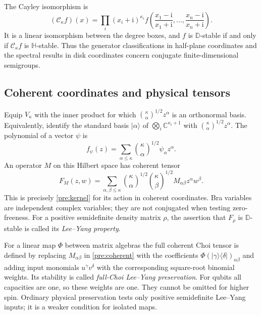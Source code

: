 \documentclass[reqno]{amsart}
\theoremstyle{definition}
\theoremstyle{remark}
\newcommand{\C}{\mathbb C}
\newcommand{\D}{\mathbb D}
\newcommand{\HH}{\mathbb H}
\begin{document}
The Cayley isomorphism is
\begin{equation}\label{pre:cayley}
 (\mathcal C_\kappa f)(x)
   =\prod_i(x_i+\mathrm i)^{\kappa_i}
      f\left(\frac{x_1-\mathrm i}{x_1+\mathrm i},\ldots,
              \frac{x_n-\mathrm i}{x_n+\mathrm i}\right).
\end{equation}
It is a linear isomorphism between the degree boxes, and $f$ is
$\D$-stable if and only if $\mathcal C_\kappa f$ is $\HH$-stable.
Thus the generator classifications in half-plane coordinates and
the spectral results in disk coordinates concern conjugate
finite-dimensional semigroups.

\subsection{Coherent coordinates and physical tensors}
Equip $V_\kappa$ with the inner product for which
$\binom{\kappa}{\alpha}^{1/2}z^\alpha$ is an orthonormal basis.
Equivalently, identify the standard basis $|\alpha\rangle$ of
$\bigotimes_i\C^{\kappa_i+1}$ with
$\binom{\kappa}{\alpha}^{1/2}z^\alpha$. The polynomial of a vector
$\psi$ is
\[
 f_\psi(z)=\sum_{\alpha\leq\kappa}
          \binom{\kappa}{\alpha}^{1/2}\psi_\alpha z^\alpha.
\]
An operator $M$ on this Hilbert space has coherent tensor
\begin{equation}\label{pre:coherent}
 F_M(z,w)=\sum_{\alpha,\beta\leq\kappa}
 \binom{\kappa}{\alpha}^{1/2}\binom{\kappa}{\beta}^{1/2}
 M_{\alpha\beta}z^\alpha w^\beta .
\end{equation}
This is precisely \eqref{pre:kernel} for its action in coherent
coordinates. Bra variables are independent complex variables;
they are not conjugated when testing zero-freeness.
For a positive semidefinite density matrix $\rho$, the assertion
that $F_\rho$ is $\D$-stable is called its \emph{Lee--Yang property}.

For a linear map $\Phi$ between matrix algebras the full coherent
Choi tensor is defined by replacing $M_{\alpha\beta}$ in
\eqref{pre:coherent} with the coefficients
$\Phi(|\gamma\rangle\langle\delta|)_{\alpha\beta}$ and adding
input monomials $u^\gamma v^\delta$ with the corresponding square-root
binomial weights. Its stability is called \emph{full-Choi
Lee--Yang preservation}. For qubits all capacities are one, so
these weights are one. They cannot be omitted for higher spin.
Ordinary physical preservation tests only positive semidefinite
Lee--Yang inputs; it is a weaker condition for isolated maps.
\end{document}
